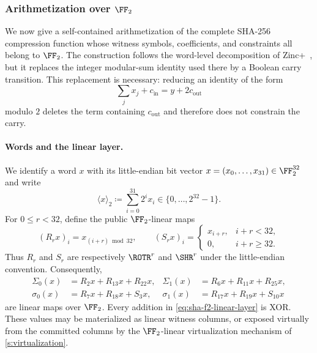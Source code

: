 \subsubsection{Arithmetization over \texorpdfstring{$\FF_2$}{F2}}
\label{s:sha256-f2-arithmetization}

We now give a self-contained arithmetization of the complete SHA-256
compression function whose witness symbols, coefficients, and constraints all
belong to $\FF_2$.  The construction follows the word-level decomposition of
Zinc+~\cite[Section~8.2]{zincplus}, but it replaces the integer modular-sum
identity used there by a Boolean carry transition.  This replacement is
necessary: reducing an identity of the form
\[
  \sum_j x_j+c_{\mathrm{in}}
  =y+2c_{\mathrm{out}}
\]
modulo $2$ deletes the term containing $c_{\mathrm{out}}$ and therefore does
not constrain the carry.

\paragraph{Words and the linear layer.}
We identify a word $x$ with its little-endian bit vector
$x=(x_0,\ldots,x_{31})\in\FF_2^{32}$ and write
\[
  \langle x\rangle_2\coloneqq\sum_{i=0}^{31}2^i x_i\in
  \{0,\ldots,2^{32}-1\}.
\]
For $0\leq r<32$, define the public $\FF_2$-linear maps
\[
  (R_r x)_i=x_{(i+r)\bmod 32},
  \qquad
  (S_r x)_i=
  \begin{cases}
    x_{i+r},&i+r<32,\\
    0,&i+r\geq32.
  \end{cases}
\]
Thus $R_r$ and $S_r$ are respectively $\ROTR^r$ and $\SHR^r$ under the
little-endian convention.  Consequently,
\begin{equation}\label{eq:sha-f2-linear-layer}
\begin{aligned}
\Sigma_0(x)&=R_2x+R_{13}x+R_{22}x,&
\Sigma_1(x)&=R_6x+R_{11}x+R_{25}x,\\
\sigma_0(x)&=R_7x+R_{18}x+S_3x,&
\sigma_1(x)&=R_{17}x+R_{19}x+S_{10}x
\end{aligned}
\end{equation}
are linear maps over $\FF_2$.  Every addition in
\eqref{eq:sha-f2-linear-layer} is XOR.  These values may be materialized as
linear witness columns, or exposed virtually from the committed columns by the
$\FF_2$-linear virtualization mechanism of \cref{s:virtualization}.

